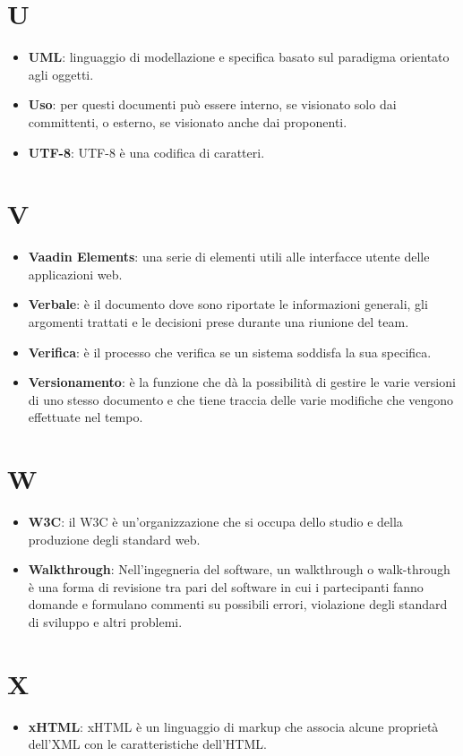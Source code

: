\documentclass[a4paper, oneside, openany]{article}
\begin{document}
\section{U}
\begin{itemize}
\item \textbf{UML}: linguaggio di modellazione e specifica basato sul paradigma orientato agli oggetti.
\item \textbf{Uso}: per questi documenti può essere interno, se visionato solo dai committenti, o esterno, se visionato anche dai proponenti.
\item \textbf{UTF-8}: UTF-8 è una codifica di caratteri.
\end{itemize}

\section{V}
\begin{itemize}
\item \textbf{Vaadin Elements}: una serie di elementi utili alle interfacce utente delle applicazioni web.
\item \textbf{Verbale}: è il documento dove sono riportate le informazioni generali, gli argomenti trattati e le decisioni prese durante una riunione del team.
\item \textbf{Verifica}: è il processo che verifica se un sistema soddisfa la sua specifica.
\item \textbf{Versionamento}: è la funzione che dà la possibilità di gestire le varie versioni di uno stesso documento e che tiene traccia delle varie modifiche che vengono effettuate nel tempo.
\end{itemize}

\section{W}
\begin{itemize}
	\item \textbf{W3C}: il W3C è un'organizzazione che si occupa dello studio e della produzione degli standard web.
	\item \textbf{Walkthrough}: Nell'ingegneria del software, un walkthrough o walk-through è una forma di revisione tra pari del software in cui i partecipanti fanno domande e formulano commenti su possibili errori, violazione degli standard di sviluppo e altri problemi.
\end{itemize}

\section{X}
\begin{itemize}
	\item \textbf{xHTML}: xHTML è un linguaggio di markup che associa alcune proprietà dell'XML con le caratteristiche dell'HTML.
\end{itemize}
\end{document}
